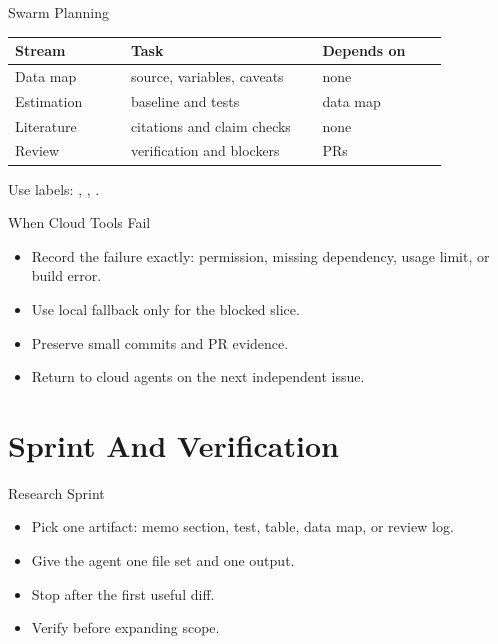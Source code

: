\begin{frame}{Swarm Planning}
  \begin{tabular}{p{0.23\linewidth}p{0.38\linewidth}p{0.25\linewidth}}
    \toprule
    Stream & Task & Depends on \\
    \midrule
    Data map & source, variables, caveats & none \\
    Estimation & baseline and tests & data map \\
    Literature & citations and claim checks & none \\
    Review & verification and blockers & PRs \\
    \bottomrule
  \end{tabular}
  \vspace{0.5em}
  Use labels: , , .
\end{frame}

\begin{frame}{When Cloud Tools Fail}
  \begin{itemize}
    \item Record the failure exactly: permission, missing dependency, usage limit, or build error.
    \item Use local fallback only for the blocked slice.
    \item Preserve small commits and PR evidence.
    \item Return to cloud agents on the next independent issue.
  \end{itemize}
\end{frame}

\section{Sprint And Verification}

\begin{frame}{Research Sprint}
  \begin{itemize}
    \item Pick one artifact: memo section, test, table, data map, or review log.
    \item Give the agent one file set and one output.
    \item Stop after the first useful diff.
    \item Verify before expanding scope.
  \end{itemize}
\end{frame}

